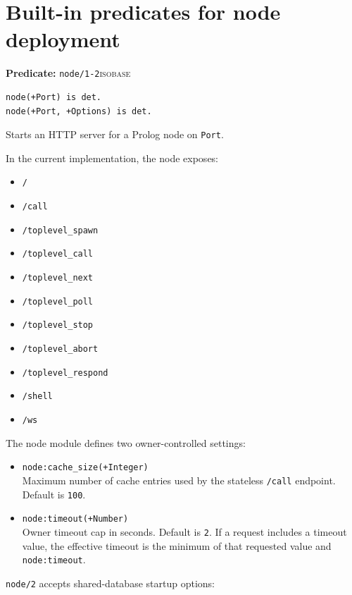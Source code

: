 \section{Built-in predicates for node deployment}\label{sec:node-predicate-api}

\noindent \textbf{Predicate:} \texttt{node/1-2}\hfill\textsc{isobase}

\begin{verbatim}
node(+Port) is det.
node(+Port, +Options) is det.
\end{verbatim}

\noindent Starts an HTTP server for a Prolog node on \texttt{Port}.

\smallskip
\noindent In the current implementation, the node exposes:

\begin{itemize}
\item \texttt{/}
\item \texttt{/call}
\item \texttt{/toplevel\_spawn}
\item \texttt{/toplevel\_call}
\item \texttt{/toplevel\_next}
\item \texttt{/toplevel\_poll}
\item \texttt{/toplevel\_stop}
\item \texttt{/toplevel\_abort}
\item \texttt{/toplevel\_respond}
\item \texttt{/shell}
\item \texttt{/ws}
\end{itemize}

\noindent The node module defines two owner-controlled settings:

\begin{itemize}
\item
  \texttt{node:cache\_size(+Integer)}\\
  Maximum number of cache entries used by the stateless \texttt{/call}
  endpoint. Default is \texttt{100}.
\item
  \texttt{node:timeout(+Number)}\\
  Owner timeout cap in seconds. Default is \texttt{2}. If a request includes a
  timeout value, the effective timeout is the minimum of that requested value
  and \texttt{node:timeout}.
\end{itemize}

\noindent \texttt{node/2} accepts shared-database startup options:

